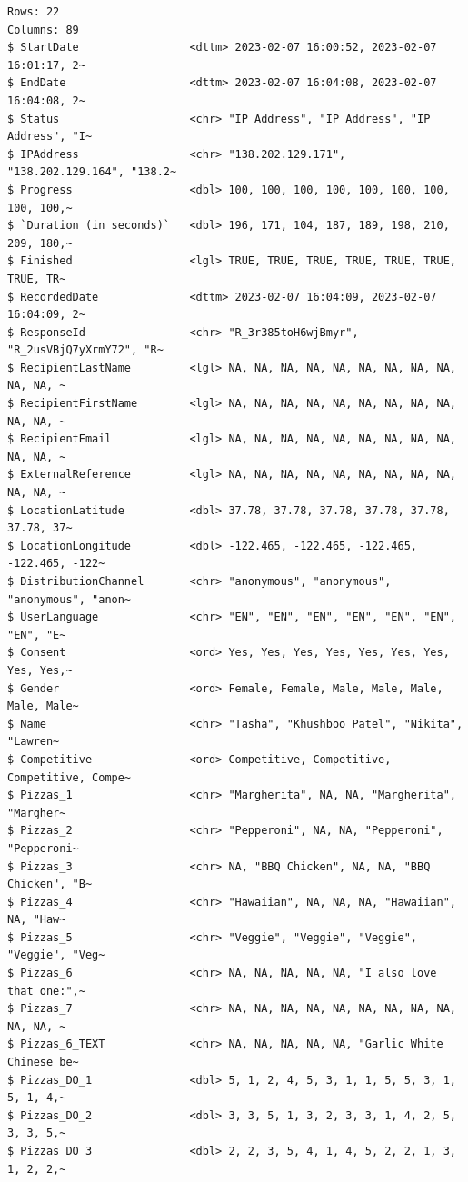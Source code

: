 \documentclass[
  letterpaper,
]{book}
\begin{document}
\begin{verbatim}
Rows: 22
Columns: 89
$ StartDate                 <dttm> 2023-02-07 16:00:52, 2023-02-07 16:01:17, 2~
$ EndDate                   <dttm> 2023-02-07 16:04:08, 2023-02-07 16:04:08, 2~
$ Status                    <chr> "IP Address", "IP Address", "IP Address", "I~
$ IPAddress                 <chr> "138.202.129.171", "138.202.129.164", "138.2~
$ Progress                  <dbl> 100, 100, 100, 100, 100, 100, 100, 100, 100,~
$ `Duration (in seconds)`   <dbl> 196, 171, 104, 187, 189, 198, 210, 209, 180,~
$ Finished                  <lgl> TRUE, TRUE, TRUE, TRUE, TRUE, TRUE, TRUE, TR~
$ RecordedDate              <dttm> 2023-02-07 16:04:09, 2023-02-07 16:04:09, 2~
$ ResponseId                <chr> "R_3r385toH6wjBmyr", "R_2usVBjQ7yXrmY72", "R~
$ RecipientLastName         <lgl> NA, NA, NA, NA, NA, NA, NA, NA, NA, NA, NA, ~
$ RecipientFirstName        <lgl> NA, NA, NA, NA, NA, NA, NA, NA, NA, NA, NA, ~
$ RecipientEmail            <lgl> NA, NA, NA, NA, NA, NA, NA, NA, NA, NA, NA, ~
$ ExternalReference         <lgl> NA, NA, NA, NA, NA, NA, NA, NA, NA, NA, NA, ~
$ LocationLatitude          <dbl> 37.78, 37.78, 37.78, 37.78, 37.78, 37.78, 37~
$ LocationLongitude         <dbl> -122.465, -122.465, -122.465, -122.465, -122~
$ DistributionChannel       <chr> "anonymous", "anonymous", "anonymous", "anon~
$ UserLanguage              <chr> "EN", "EN", "EN", "EN", "EN", "EN", "EN", "E~
$ Consent                   <ord> Yes, Yes, Yes, Yes, Yes, Yes, Yes, Yes, Yes,~
$ Gender                    <ord> Female, Female, Male, Male, Male, Male, Male~
$ Name                      <chr> "Tasha", "Khushboo Patel", "Nikita", "Lawren~
$ Competitive               <ord> Competitive, Competitive, Competitive, Compe~
$ Pizzas_1                  <chr> "Margherita", NA, NA, "Margherita", "Margher~
$ Pizzas_2                  <chr> "Pepperoni", NA, NA, "Pepperoni", "Pepperoni~
$ Pizzas_3                  <chr> NA, "BBQ Chicken", NA, NA, "BBQ Chicken", "B~
$ Pizzas_4                  <chr> "Hawaiian", NA, NA, NA, "Hawaiian", NA, "Haw~
$ Pizzas_5                  <chr> "Veggie", "Veggie", "Veggie", "Veggie", "Veg~
$ Pizzas_6                  <chr> NA, NA, NA, NA, NA, "I also love that one:",~
$ Pizzas_7                  <chr> NA, NA, NA, NA, NA, NA, NA, NA, NA, NA, NA, ~
$ Pizzas_6_TEXT             <chr> NA, NA, NA, NA, NA, "Garlic White Chinese be~
$ Pizzas_DO_1               <dbl> 5, 1, 2, 4, 5, 3, 1, 1, 5, 5, 3, 1, 5, 1, 4,~
$ Pizzas_DO_2               <dbl> 3, 3, 5, 1, 3, 2, 3, 3, 1, 4, 2, 5, 3, 3, 5,~
$ Pizzas_DO_3               <dbl> 2, 2, 3, 5, 4, 1, 4, 5, 2, 2, 1, 3, 1, 2, 2,~

\end{verbatim}
\end{document}

